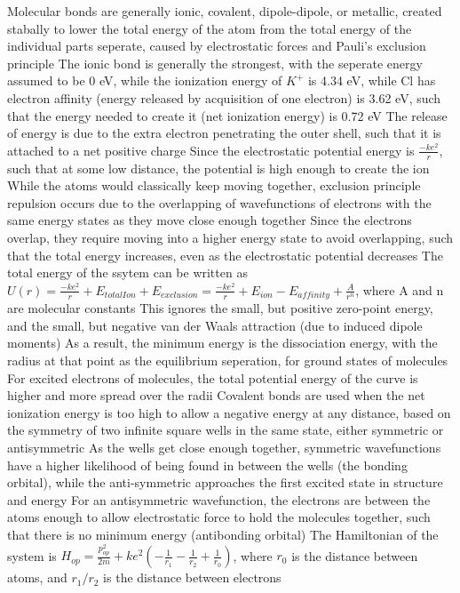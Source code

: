 \documentclass[11 pt, twoside]{article}
\newenvironment{outline*}
{
	\begin{outline}[enumerate]
	}
	{\end{outline}
}
\begin{document}
\begin{outline*}
\1 Molecular bonds are generally ionic, covalent, dipole-dipole, or metallic, created stabally to lower the total energy of the atom from the total energy of the individual parts seperate, caused by electrostatic forces and Pauli's exclusion principle
\1 The ionic bond is generally the strongest, with the seperate energy assumed to be 0 eV, while the ionization energy of $K^+$ is 4.34 eV, while Cl has electron affinity (energy released by acquisition of one electron) is 3.62 eV, such that the energy needed to create it (net ionization energy) is 0.72 eV
	\2 The release of energy is due to the extra electron penetrating the outer shell, such that it is attached to a net positive charge
	\2 Since the electrostatic potential energy is $\frac{-ke^2}{r}$, such that at some low distance, the potential is high enough to create the ion
		\3 While the atoms would classically keep moving together, exclusion principle repulsion occurs due to the overlapping of wavefunctions of electrons with the same energy states as they move close enough together
		\3 Since the electrons overlap, they require moving into a higher energy state to avoid overlapping, such that the total energy increases, even as the electrostatic potential decreases
			\4 The total energy of the ssytem can be written as $U(r) = \frac{-ke^2}{r} + E_{totalIon} + E_{exclusion} = \frac{-ke^2}{r} + E_{ion} - E_{affinity} + \frac{A}{r^n}$, where A and n are molecular constants
			\4 This ignores the small, but positive zero-point energy, and the small, but negative van der Waals attraction (due to induced dipole moments)
	\2 As a result, the minimum energy is the dissociation energy, with the radius at that point as the equilibrium seperation, for ground states of molecules
		\3 For excited electrons of molecules, the total potential energy of the curve is higher and more spread over the radii
\1 Covalent bonds are used when the net ionization energy is too high to allow a negative energy at any distance, based on the symmetry of two infinite square wells in the same state, either symmetric or antisymmetric
	\2 As the wells get close enough together, symmetric wavefunctions have a higher likelihood of being found in between the wells (the bonding orbital), while the anti-symmetric approaches the first excited state in structure and energy
		\3 For an antisymmetric wavefunction, the electrons are between the atoms enough to allow electrostatic force to hold the molecules together, such that there is no minimum energy (antibonding orbital)
	\2 The Hamiltonian of the system is $H_{op} = \frac{p_{op}^2}{2m} + ke^2(-\frac{1}{r_1} - \frac{1}{r_2} + \frac{1}{r_0})$, where $r_0$ is the distance between atoms, and $r_1/r_2$ is the distance between electrons

\end{outline*}
\end{document}
